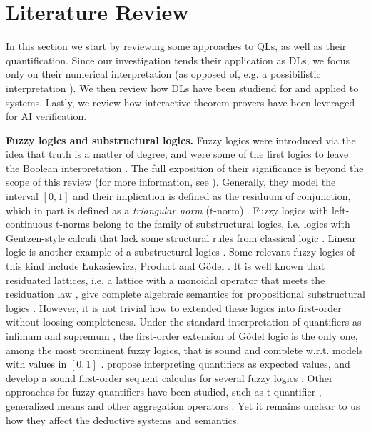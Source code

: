 \section{Literature Review} \label{section:LiteratureReview}

In this section we start by reviewing some approaches to QLs, as well as their quantification. Since our investigation tends their application as DLs, we focus only on their numerical interpretation (as opposed of, e.g. a possibilistic interpretation \citep{LIU19981}). %
We then review how DLs have been studiend for and applied to \InAI{} systems. Lastly, we review how interactive theorem provers have been leveraged for AI verification.

\textbf{Fuzzy logics and substructural logics.} Fuzzy logics were introduced via the idea that truth is a matter of degree, and were some of the first logics to leave the Boolean interpretation \citep{galatos2007residuated}. The full exposition of their significance is beyond the scope of this review (for more information, see \cite{cintula2011handbook, prooffuzzy}). Generally, they model the interval $[0,1]$ and their implication is defined as the residuum of conjunction, which in part is defined as a \emph{triangular norm} (t-norm) \citep{cintula2011handbook,prooffuzzy}. Fuzzy logics with left-continuous t-norms belong to the family of substructural logics, i.e. logics with Gentzen-style calculi that lack some structural rules from classical logic \citep{galatos2007residuated}. Linear logic is another example of a substructural logics \citep{agliano2025algebraic, galatos2007residuated}. Some relevant fuzzy logics of this kind include Łukasiewicz, Product and G\"{o}del \citep{cintula2011handbook,prooffuzzy}. It is well known that residuated lattices, i.e. a lattice with a monoidal operator that meets the residuation law \citep{galatos2007residuated}, give complete algebraic semantics for propositional substructural logics \citep{galatos2007residuated}. However, it is not trivial how to extended these logics into first-order without loosing completeness. Under the standard interpretation of quantifiers as infimum and supremum \citep{rescher1969many}, the first-order extension of Gödel logic is the only one, among the most prominent fuzzy logics, that is sound and complete w.r.t. models with values in $[0,1]$ \citep{cintula2011handbook}. \citeauthor{slusarz2023logic} propose interpreting quantifiers as expected values, and develop a sound first-order sequent calculus for several fuzzy logics \citep{slusarz2023logic}. Other approaches for fuzzy quantifiers have been studied, such as t-quantifier \citep{LIU19981}, generalized means \citep{badreddine2022logic, slusarz2023logic} and other aggregation operators \citep{LIU19981}. Yet it remains unclear to us how they affect the deductive systems and semantics.

